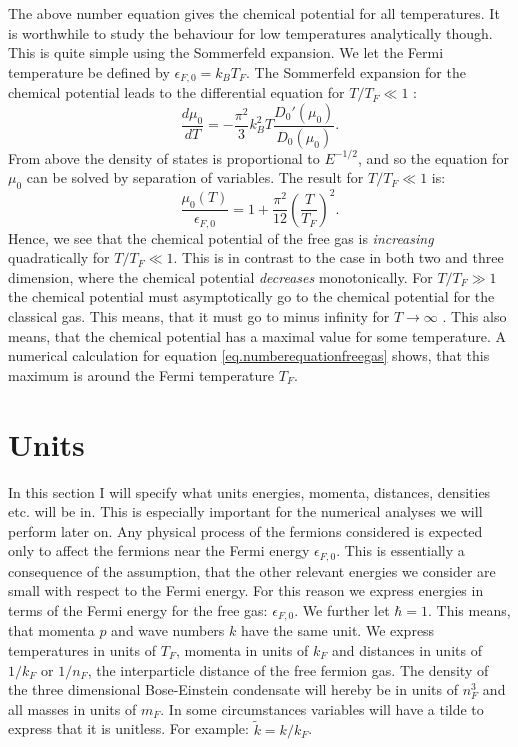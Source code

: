 The above number equation gives the chemical potential for all temperatures. It is worthwhile to study the behaviour for low temperatures analytically though. This is quite simple using the Sommerfeld expansion. We let the Fermi temperature be defined by $\epsilon_{F,0} = k_B T_F$. The Sommerfeld expansion for the chemical potential leads to the differential equation for $T/T_F \ll 1$ \cite[pp. 115-116]{GiuseppeGiuseppe}:
\begin{equation}
\frac{d\mu_0}{dT} = -\frac{\pi^2}{3}k_B^2 T \frac{D_0'(\mu_0)}{D_0(\mu_0)}. \nonumber
\end{equation}
From above the density of states is proportional to $E^{-1/2}$, and so the equation for $\mu_0$ can be solved by separation of variables. The result for $T/T_F\ll 1$ is:
\begin{equation}
\frac{\mu_0(T)}{\epsilon_{F,0}} = 1 + \frac{\pi^2}{12}\left(\frac{T}{T_F}\right)^2. 
\label{eq.Sommerfeldexpansionchemicalpotential}
\end{equation}
Hence, we see that the chemical potential of the free gas is \textit{increasing} quadratically for $T/T_F \ll 1$. This is in contrast to the case in both two and three dimension, where the chemical potential \textit{decreases} monotonically. For $T/T_F \gg 1$ the chemical potential must asymptotically go to the chemical potential for the classical gas. This means, that it must go to minus infinity for $T\to \infty$ \cite[pp. 117-118]{SchroederThermal}. This also means, that the chemical potential has a maximal value for some temperature. A numerical calculation for equation \eqref{eq.numberequationfreegas} shows, that this maximum is around the Fermi temperature $T_F$. 

\section{Units}
In this section I will specify what units energies, momenta, distances, densities etc. will be in. This is especially important for the numerical analyses we will perform later on. Any physical process of the fermions considered is expected only to affect the fermions near the Fermi energy $\epsilon_{F,0}$. This is essentially a consequence of the assumption, that the other relevant energies we consider are small with respect to the Fermi energy. For this reason we express energies in terms of the Fermi energy for the free gas: $\epsilon_{F,0}$. We further let $\hbar = 1$. This means, that momenta $p$ and wave numbers $k$ have the same unit. We express temperatures in units of $T_F$, momenta in units of $k_F$ and distances in units of $1/k_F$ or $1/n_F$, the interparticle distance of the free fermion gas. The density of the three dimensional Bose-Einstein condensate will hereby be in units of $n_F^3$ and all masses in units of $m_F$. In some circumstances variables will have a tilde to express that it is unitless. For example: $\tilde{k} = k/k_F$.

